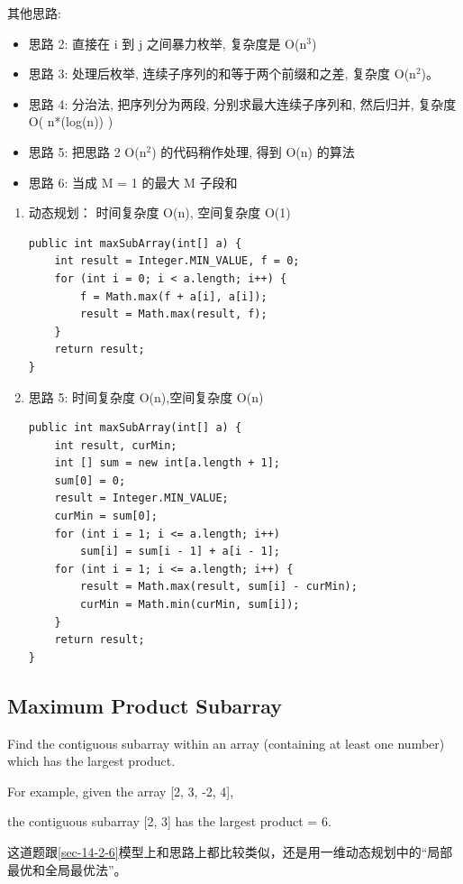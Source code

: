 \documentclass[12pt]{book}
\begin{document}
其他思路:
\begin{itemize}
\item 思路 2: 直接在 i 到 j 之间暴力枚举, 复杂度是 O(n$^{\text{3}}$)
\item 思路 3: 处理后枚举, 连续子序列的和等于两个前缀和之差, 复杂度 O(n$^{\text{2}}$)。
\item 思路 4: 分治法, 把序列分为两段, 分别求最大连续子序列和, 然后归并, 复杂度 O( n*(log(n)) )
\item 思路 5: 把思路 2 O(n$^{\text{2}}$) 的代码稍作处理, 得到 O(n) 的算法
\item 思路 6: 当成 M = 1 的最大 M 子段和
\end{itemize}
\begin{enumerate}
\item 动态规划： 时间复杂度 O(n), 空间复杂度 O(1)
\label{sec-14-2-6-1}
\lstset{language=java,label= ,caption= ,numbers=none}
\begin{lstlisting}
public int maxSubArray(int[] a) {
    int result = Integer.MIN_VALUE, f = 0;
    for (int i = 0; i < a.length; i++) {
        f = Math.max(f + a[i], a[i]);
        result = Math.max(result, f);
    }
    return result;
}
\end{lstlisting}
\item 思路 5: 时间复杂度 O(n),空间复杂度 O(n)
\label{sec-14-2-6-2}
\lstset{language=java,label= ,caption= ,numbers=none}
\begin{lstlisting}
public int maxSubArray(int[] a) {
    int result, curMin;
    int [] sum = new int[a.length + 1];
    sum[0] = 0;
    result = Integer.MIN_VALUE;
    curMin = sum[0];
    for (int i = 1; i <= a.length; i++) 
        sum[i] = sum[i - 1] + a[i - 1];
    for (int i = 1; i <= a.length; i++) {
        result = Math.max(result, sum[i] - curMin);
        curMin = Math.min(curMin, sum[i]);
    }
    return result;
}
\end{lstlisting}
\end{enumerate}
\subsection{Maximum Product Subarray}
\label{sec-14-2-7}
Find the contiguous subarray within an array (containing at least one number) which has the largest product.

For example, given the array [2, 3, -2, 4], 

the contiguous subarray [2, 3] has the largest product = 6.

这道题跟\ref{sec-14-2-6}模型上和思路上都比较类似，还是用一维动态规划中的“局部最优和全局最优法”。
\end{document}
